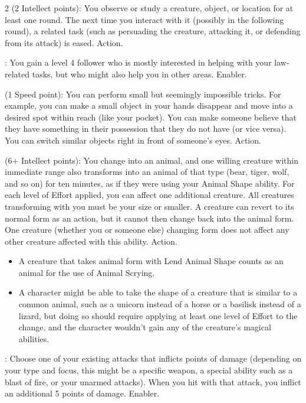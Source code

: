 \begin{multicols}{2}
 (2 Intellect points): You observe or study a creature, object, or location for at least one round. The next time you interact with it (possibly in the following round), a related task (such as persuading the creature, attacking it, or defending from its attack) is eased. Action. 
 
: You gain a level 4 follower who is mostly interested in helping with your law-related tasks, but who might also help you in other areas. Enabler.
 
 (1 Speed point): You can perform small but seemingly impossible tricks. For example, you can make a small object in your hands disappear and move into a desired spot within reach (like your pocket). You can make someone believe that they have something in their possession that they do not have (or vice versa). You can switch similar objects right in front of someone’s eyes. Action. 

 (6+ Intellect points): You change into an animal, and one willing creature within immediate range also transforms into an animal of that type (bear, tiger, wolf, and so on) for ten minutes, as if they were using your Animal Shape ability. For each level of Effort applied, you can affect one additional creature. All creatures transforming with you must be your size or smaller. A creature can revert to its normal form as an action, but it cannot then change back into the animal form. One creature (whether you or someone else) changing form does not affect any other creature affected with this ability. Action.
	
\begin{itemize}	
\item A creature that takes animal form with Lend Animal Shape counts as an animal for the use of Animal Scrying.
\item A character might be able to take the shape of a creature that is similar to a common animal, such as a unicorn instead of a horse or a basilisk instead of a lizard, but doing so should require applying at least one level of Effort to the change, and the character wouldn’t gain any of the creature’s magical abilities.
\end{itemize}

: Choose one of your existing attacks that inflicts points of damage (depending on your type and focus, this might be a specific weapon, a special ability such as a blast of fire, or your unarmed attacks). When you hit with that attack, you inflict an additional 5 points of damage. Enabler.
 

\end{multicols}

